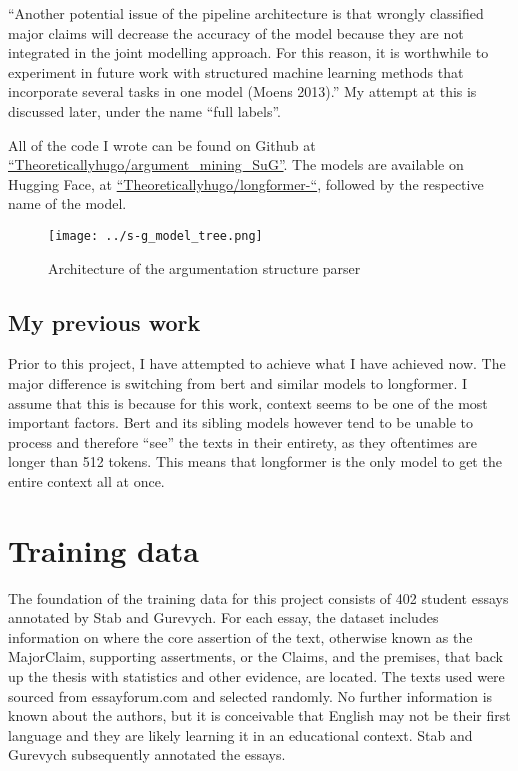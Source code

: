 \documentclass[12]{article}
\theoremstyle{mytheoremstyle}
\theoremstyle{mytheoremstyle}
\theoremstyle{myproblemstyle}
\begin{document}
  ``Another potential issue of the pipeline architecture is that
  wrongly classified major claims will decrease the accuracy of the model because they
  are not integrated in the joint modelling approach. For this reason, it is worthwhile to
  experiment in future work with structured machine learning methods that incorporate
  several tasks in one model (Moens 2013).''\cite{stab-gurevych-2017-parsing}
  My attempt at this is discussed later, under the name ``full labels''.

  All of the code I wrote can be found on Github at \href{https://github.com/Theoreticallyhugo/argument_mining_SuG}{``Theoreticallyhugo/argument\_mining\_SuG''}. 
  The models are available on Hugging Face, at \href{https://huggingface.co/Theoreticallyhugo}{``Theoreticallyhugo/longformer-``}, followed by the respective name of the model. 
  \begin{figure}[!h]
    \centering
    \texttt{[image: ../s-g\_model\_tree.png]}
    \caption{Architecture of the argumentation structure parser}
    \label{fig:model_tree}
  \end{figure}
  \subsection{My previous work}
  Prior to this project, I have attempted to achieve what I have achieved now.
  The major difference is switching from bert and similar models to longformer. 
  I assume that this is because for this work, context seems to be one of the most important factors. 
  Bert and its sibling models however tend to be unable to process and therefore ``see'' the texts in their entirety, as they oftentimes are longer than 512 tokens. 
  This means that longformer is the only model to get the entire context all at once.

  \section{Training data\dotfill}
  The foundation of the training data for this project consists of 402 student essays annotated by Stab and Gurevych. 
  For each essay, the dataset includes information on where the core assertion of the text, otherwise known as the MajorClaim, supporting assertments, or the Claims, and the premises, that back up the thesis with statistics and other evidence, are located. 
  The texts used were sourced from essayforum.com and selected randomly. 
  No further information is known about the authors, but it is conceivable that English may not be their first language and they are likely learning it in an educational context.
  Stab and Gurevych subsequently annotated the essays.
  
\end{document}
